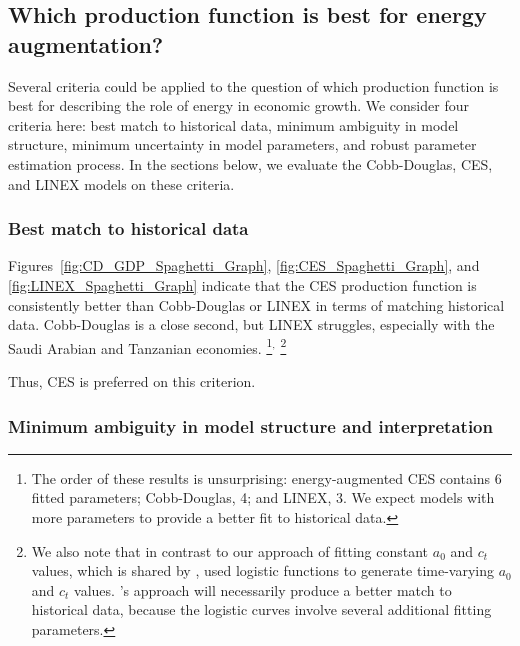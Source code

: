 \documentclass[preprint,authoryear,12pt]{elsarticle}\usepackage[]{graphicx}\usepackage[]{color}
\begin{document}
\subsection{Which production function is best for energy augmentation?} 
\label{sec:which_best}

Several criteria could be applied 
to the question of which production function is best
for describing the role of energy in economic growth. 
We consider four criteria here:
best match to historical data, 
minimum ambiguity in model structure,
minimum uncertainty in model parameters, and
robust parameter estimation process.
In the sections below, we evaluate the Cobb-Douglas, CES, and LINEX
models on these criteria.


\subsubsection{Best match to historical data} 
\label{sec:match_history}

Figures~\ref{fig:CD_GDP_Spaghetti_Graph}, \ref{fig:CES_Spaghetti_Graph}, and
\ref{fig:LINEX_Spaghetti_Graph} indicate that the CES production function
is consistently better than Cobb-Douglas or LINEX in terms of matching historical data.
Cobb-Douglas is a close second, but
LINEX struggles, especially with the Saudi Arabian and Tanzanian economies.%
  \footnote{
  The order of these results is unsurprising: 
  energy-augmented CES contains 6 fitted parameters; 
  Cobb-Douglas, 4; 
  and LINEX, 3.
  We expect models with more parameters to provide a better fit to historical data.
  }$^,$%
  \footnote{
  We also note that in contrast to our approach of fitting constant $a_0$ and $c_t$ values, 
  which is shared by \citet{Warr:2012cg},
  \citet{Kummel:2011aa} used logistic functions to generate time-varying
  $a_0$ and $c_t$ values.
  \citeauthor{Kummel:2011aa}'s approach will necessarily produce a better match to historical data,
  because the logistic curves involve several additional fitting parameters.
  }

Thus, CES is preferred on this criterion.


\subsubsection{Minimum ambiguity in model structure and interpretation} 
\label{sec:min_ambiguity}
\end{document}
